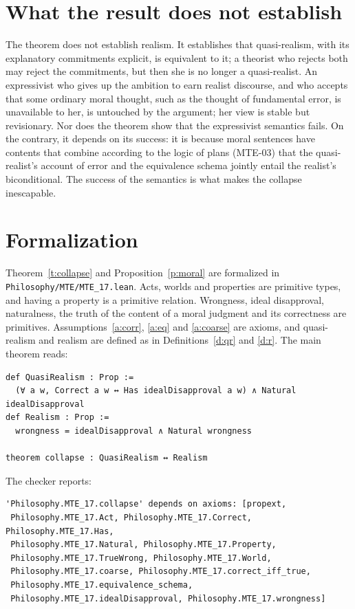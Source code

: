 \documentclass{situationist-preprint}
\begin{document}
\section{What the result does not establish}\label{s:limits}

The theorem does not establish realism. It establishes that quasi-realism, with its explanatory commitments explicit, is equivalent to it; a theorist who rejects both may reject the commitments, but then she is no longer a quasi-realist. An expressivist who gives up the ambition to earn realist discourse, and who accepts that some ordinary moral thought, such as the thought of fundamental error, is unavailable to her, is untouched by the argument; her view is stable but revisionary. Nor does the theorem show that the expressivist semantics fails. On the contrary, it depends on its success: it is because moral sentences have contents that combine according to the logic of plans (MTE-03) that the quasi-realist's account of error and the equivalence schema jointly entail the realist's biconditional. The success of the semantics is what makes the collapse inescapable.

\section{Formalization}\label{s:formal}

Theorem~\ref{t:collapse} and Proposition~\ref{p:moral} are formalized in \nolinkurl{Philosophy/MTE/MTE_17.lean}. Acts, worlds and properties are primitive types, and having a property is a primitive relation. Wrongness, ideal disapproval, naturalness, the truth of the content of a moral judgment and its correctness are primitives. Assumptions~\ref{a:corr}, \ref{a:eq} and \ref{a:coarse} are axioms, and quasi-realism and realism are defined as in Definitions~\ref{d:qr} and \ref{d:r}. The main theorem reads:

\begin{lstlisting}
def QuasiRealism : Prop :=
  (∀ a w, Correct a w ↔ Has idealDisapproval a w) ∧ Natural idealDisapproval
def Realism : Prop :=
  wrongness = idealDisapproval ∧ Natural wrongness

theorem collapse : QuasiRealism ↔ Realism
\end{lstlisting}

The checker reports:

\begin{lstlisting}
'Philosophy.MTE_17.collapse' depends on axioms: [propext,
 Philosophy.MTE_17.Act, Philosophy.MTE_17.Correct, Philosophy.MTE_17.Has,
 Philosophy.MTE_17.Natural, Philosophy.MTE_17.Property,
 Philosophy.MTE_17.TrueWrong, Philosophy.MTE_17.World,
 Philosophy.MTE_17.coarse, Philosophy.MTE_17.correct_iff_true,
 Philosophy.MTE_17.equivalence_schema,
 Philosophy.MTE_17.idealDisapproval, Philosophy.MTE_17.wrongness]
\end{lstlisting}
\end{document}
